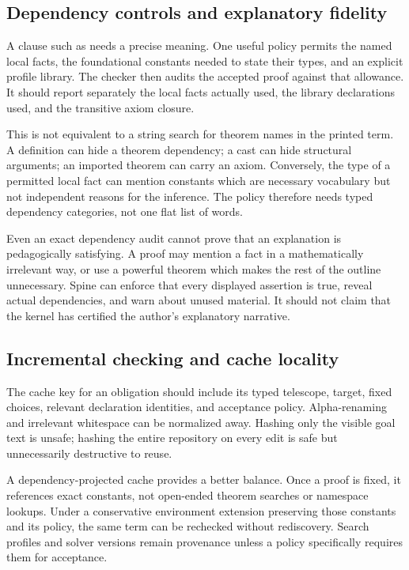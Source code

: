 \documentclass[11pt,letterpaper]{article}
\theoremstyle{definition}
\theoremstyle{remark}
\newcommand{\Spine}{Spine}
\newcommand{\code}[1]{\texttt{\detokenize{#1}}}
\begin{document}
\subsection{Dependency controls and explanatory fidelity}
A clause such as \code{using only h1, h2} needs a precise meaning. One useful policy permits the named local facts, the foundational constants needed to state their types, and an explicit profile library. The checker then audits the accepted proof against that allowance. It should report separately the local facts actually used, the library declarations used, and the transitive axiom closure.

This is not equivalent to a string search for theorem names in the printed term. A definition can hide a theorem dependency; a cast can hide structural arguments; an imported theorem can carry an axiom. Conversely, the type of a permitted local fact can mention constants which are necessary vocabulary but not independent reasons for the inference. The policy therefore needs typed dependency categories, not one flat list of words.

Even an exact dependency audit cannot prove that an explanation is pedagogically satisfying. A proof may mention a fact in a mathematically irrelevant way, or use a powerful theorem which makes the rest of the outline unnecessary. \Spine{} can enforce that every displayed assertion is true, reveal actual dependencies, and warn about unused material. It should not claim that the kernel has certified the author's explanatory narrative.

\subsection{Incremental checking and cache locality}
The cache key for an obligation should include its typed telescope, target, fixed choices, relevant declaration identities, and acceptance policy. Alpha-renaming and irrelevant whitespace can be normalized away. Hashing only the visible goal text is unsafe; hashing the entire repository on every edit is safe but unnecessarily destructive to reuse.

A dependency-projected cache provides a better balance. Once a proof is fixed, it references exact constants, not open-ended theorem searches or namespace lookups. Under a conservative environment extension preserving those constants and its policy, the same term can be rechecked without rediscovery. Search profiles and solver versions remain provenance unless a policy specifically requires them for acceptance.
\end{document}
